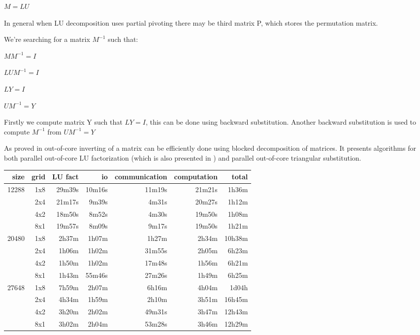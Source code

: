 $M = LU$
\bigskip

In general when LU decomposition uses partial pivoting there may be third matrix P, which stores the permutation matrix.

We're searching for a matrix $M^{-1}$ such that:
\bigskip

$MM^{-1}=I$

$LUM^{-1}=I$
\newline

$LY=I$

$UM^{-1}=Y$
\bigskip

Firstly we compute matrix Y such that $LY=I$, this can be done using backward substitution.
Another backward substitution is used to compute $M^{-1}$ from $UM^{-1}=Y$

As proved in \cite{matinv} out-of-core inverting of a matrix can be efficiently done using blocked decomposition of matrices.
It presents algorithms for both parallel out-of-core LU factorization (which is also presented in \cite{ooc-scalapack}) and parallel out-of-core triangular substitution.
\bigskip

\begin{center}
\begin{tabular}{|r|r|r|r|r|r|r|} \hline
    size & grid & LU fact & io & communication & computation & total \\ \hline
    
    12288 & 1x8 & 29m39s & 10m16s & 11m19s & 21m21s & 1h36m \\ \hline
	& 2x4 & 21m17s & 9m39s & 4m31s & 20m27s & 1h12m \\ \cline{2-7}
	& 4x2 & 18m50s & 8m52s & 4m30s & 19m50s & 1h08m \\ \cline{2-7}
	& 8x1 & 19m57s & 8m09s & 9m17s & 19m50s & 1h21m \\ \hline
    20480 & 1x8 & 2h37m & 1h07m & 1h27m & 2h34m & 10h38m\\ \hline
	& 2x4 & 1h06m & 1h02m & 31m55s & 2h05m & 6h23m \\ \cline{2-7}
	& 4x2 & 1h50m & 1h02m & 17m48s & 1h56m & 6h21m \\ \cline{2-7}
	& 8x1 & 1h43m & 55m46s & 27m26s & 1h49m & 6h25m \\ \hline
    27648 & 1x8 & 7h59m & 2h07m & 6h16m & 4h04m & 1d04h \\ \hline
	& 2x4 & 4h34m & 1h59m & 2h10m & 3h51m & 16h45m \\ \cline{2-7}
	& 4x2 & 3h20m & 2h02m & 49m31s & 3h47m & 12h43m \\ \cline{2-7}
	& 8x1 & 3h02m & 2h04m & 53m28s & 3h46m & 12h29m \\ \hline
    
\end{tabular}
\end{center}
\bigskip

